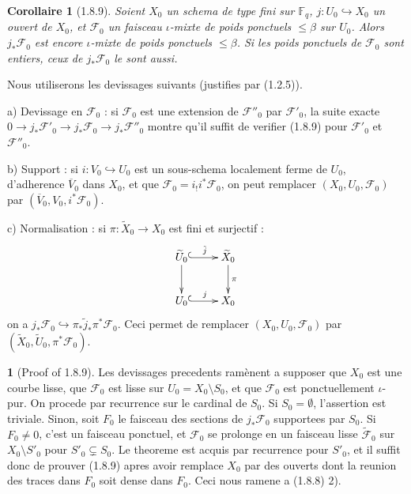 \documentclass[12pt,a4paper]{article}
\theoremstyle{plain}
\newtheorem{corollaire}[theorem]{Corollaire}
\theoremstyle{definition}
\theoremstyle{definition}
\newtheorem{para}{}[section]
\theoremstyle{remark}
\begin{document}
\begin{corollaire}[1.8.9]
Soient $X_0$ un schema de type fini sur $\mathbb{F}_q$, $j: U_0 \hookrightarrow X_0$ un ouvert de $X_0$, et $\mathscr{F}_0$ un faisceau $\iota$-mixte de poids ponctuels $\leq \beta$ sur $U_0$. Alors $j_* \mathscr{F}_0$ est encore $\iota$-mixte de poids ponctuels $\leq \beta$. Si les poids ponctuels de $\mathscr{F}_0$ sont entiers, ceux de $j_* \mathscr{F}_0$ le sont aussi.
\end{corollaire}

Nous utiliserons les devissages suivants (justifies par (1.2.5)).

a) Devissage en $\mathscr{F}_0$ : si $\mathscr{F}_0$ est une extension de $\mathscr{F}''_0$ par $\mathscr{F}'_0$, la suite exacte $0 \to j_* \mathscr{F}'_0 \to j_* \mathscr{F}_0 \to j_* \mathscr{F}''_0$ montre qu'il suffit de verifier (1.8.9) pour $\mathscr{F}'_0$ et $\mathscr{F}''_0$.

b) Support : si $i: V_0 \hookrightarrow U_0$ est un sous-schema localement ferme de $U_0$, d'adherence $\overline{V}_0$ dans $X_0$, et que $\mathscr{F}_0 = i_! i^* \mathscr{F}_0$, on peut remplacer $(X_0, U_0, \mathscr{F}_0)$ par $(\overline{V}_0, V_0, i^* \mathscr{F}_0)$.

c) Normalisation : si $\pi: \widetilde{X}_0 \to X_0$ est fini et surjectif :
\[\xymatrix{
\widetilde{U}_0 \ar@{^{(}->}[r]^{\tilde{j}} \ar[d] & \widetilde{X}_0 \ar[d]^{\pi} \\
U_0 \ar@{^{(}->}[r]^j & X_0
}\]
on a $j_* \mathscr{F}_0 \hookrightarrow \pi_* \tilde{j}_* \pi^* \mathscr{F}_0$. Ceci permet de remplacer $(X_0, U_0, \mathscr{F}_0)$ par $(\widetilde{X}_0, \widetilde{U}_0, \pi^* \mathscr{F}_0)$.

\begin{para}[Proof of 1.8.9]
Les devissages precedents ram\`enent a supposer que $X_0$ est une courbe lisse, que $\mathscr{F}_0$ est lisse sur $U_0 = X_0 \setminus S_0$, et que $\mathscr{F}_0$ est ponctuellement $\iota$-pur. On procede par recurrence sur le cardinal de $S_0$. Si $S_0 = \emptyset$, l'assertion est triviale. Sinon, soit $F_0$ le faisceau des sections de $j_* \mathscr{F}_0$ supportees par $S_0$. Si $F_0 \neq 0$, c'est un faisceau ponctuel, et $\mathscr{F}_0$ se prolonge en un faisceau lisse $\widetilde{\mathscr{F}}_0$ sur $X_0 \setminus S'_0$ pour $S'_0 \subsetneq S_0$. Le theoreme est acquis par recurrence pour $S'_0$, et il suffit donc de prouver (1.8.9) apres avoir remplace $X_0$ par des ouverts dont la reunion des traces dans $F_0$ soit dense dans $F_0$. Ceci nous ramene a (1.8.8) 2).
\end{para}
\end{document}
